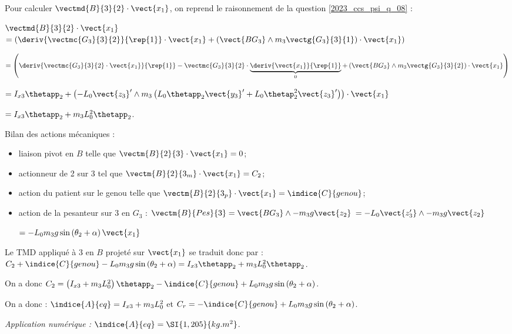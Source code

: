 \begin{corrige}

Pour calculer $\vectmd{B}{3}{2} \cdot \vect{x_1}$, on reprend le raisonnement de la question \ref{2023_ccs_psi_q_08} :  

 $\vectmd{B}{3}{2} \cdot \vect{x_1}$  
$= \left(\deriv{\vectmc{G_3}{3}{2}}{\rep{1}} \cdot \vect{x_1} + \left(\vect{BG_3} \wedge m_3 \vectg{G_3}{3}{1}\right)\cdot \vect{x_1} \right)  $

$= \left(\deriv{\vectmc{G_3}{3}{2}\cdot \vect{x_1}}{\rep{1}} - \vectmc{G_3}{3}{2}\cdot \underbrace{\deriv{ \vect{x_1}}{\rep{1}}}_{0}   + \left(\vect{BG_3} \wedge m_3 \vectg{G_3}{3}{2}\right)\cdot \vect{x_1} \right)  $

$=I_{x3}\thetapp_2 +\left( -L_0 \vect{z_3}'	 \wedge m_3  \left( L_0 \thetapp_2 \vect{y_3}' +L_0 \thetap_2^2 \vect{z_3}' \right)\right)\cdot \vect{x_1}$


$=I_{x3}\thetapp_2 + m_3 L_0^2 \thetapp_2  $.

Bilan des actions mécaniques : 
\begin{itemize}
\item liaison pivot en $B$ telle que $\vectm{B}{2}{3}\cdot \vect{x_1} = 0$;
\item actionneur de 2 sur 3 tel que  $\vectm{B}{2}{3_m}\cdot \vect{x_1} = C_2$;
\item action du patient sur le genou telle que  $\vectm{B}{2}{3_p}\cdot \vect{x_1} = \indice{C}{genou}$;
\item action de la pesanteur sur 3 en $G_3$ : $\vectm{B}{Pes}{3} = \vect{BG_3}\wedge -m_3 g\vect{z_2}$ $= -L_0 \vect{z_3'}\wedge -m_3 g\vect{z_2}$

$= - L_0 m_3 g \sin\left(\theta_2 + \alpha\right)\vect{x_1}$
\end{itemize}

Le TMD appliqué à 3 en $B$ projeté sur $\vect{x_1}$ se traduit donc par : 
$C_2 +\indice{C}{genou} - L_0 m_3 g \sin\left(\theta_2 + \alpha\right)=I_{x3}\thetapp_2 + m_3 L_0^2 \thetapp_2  $.

On a donc $C_2 = \left( I_{x3} + m_3 L_0^2 \right)\thetapp_2  - \indice{C}{genou} + L_0 m_3 g \sin\left(\theta_2 + \alpha\right) $.

On a donc : $\indice{A}{eq} = I_{x3} + m_3 L_0^2$ et $C_r =  - \indice{C}{genou} + L_0 m_3 g \sin\left(\theta_2 + \alpha\right)$.


\textit{Application numérique :} $\indice{A}{eq} =\SI{1,205}{kg.m^2}$.

\end{corrige}
\else
\fi


